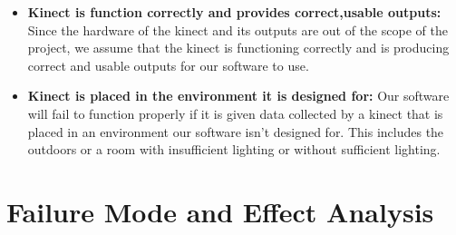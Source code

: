 \documentclass{article}
\begin{document}
\begin{itemize}
\item  \textbf{Kinect is function correctly and provides correct,usable outputs:} Since the hardware of the kinect and its outputs are out of the scope of the project, we assume that the kinect is functioning correctly and is producing correct and usable outputs for our software to use. 

\item  \textbf{Kinect is placed in the environment it is designed for:} Our software will fail to function properly if it is given data collected by a kinect that is placed in an environment our software isn't designed for. This includes the outdoors or a room with insufficient lighting or without sufficient lighting.          

\end{itemize}

\section{Failure Mode and Effect Analysis}
\end{document}

